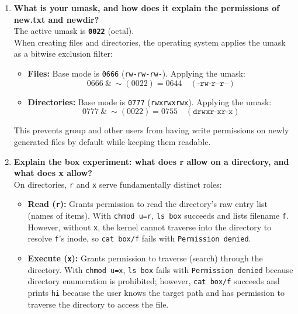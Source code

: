 \documentclass{labreport}
\begin{document}
\begin{enumerate}[leftmargin=*]
    \item \textbf{What is your umask, and how does it explain the permissions of new.txt and newdir?}\\[0.2em]
    The active umask is \textbf{\texttt{0022}} (octal).\\
    When creating files and directories, the operating system applies the umask as a bitwise exclusion filter:
    \begin{itemize}[noitemsep, topsep=2pt]
        \item \textbf{Files:} Base mode is \texttt{0666} (\texttt{rw-rw-rw-}). Applying the umask:
        \[
        0666 \ \& \ \sim(0022) = 0644 \quad (\texttt{-rw-r--r--})
        \]
        \item \textbf{Directories:} Base mode is \texttt{0777} (\texttt{rwxrwxrwx}). Applying the umask:
        \[
        0777 \ \& \ \sim(0022) = 0755 \quad (\texttt{drwxr-xr-x})
        \]
    \end{itemize}
    This prevents group and other users from having write permissions on newly generated files by default while keeping them readable.

    \item \textbf{Explain the box experiment: what does r allow on a directory, and what does x allow?}\\[0.2em]
    On directories, \texttt{r} and \texttt{x} serve fundamentally distinct roles:
    \begin{itemize}[noitemsep, topsep=2pt]
        \item \textbf{Read (\texttt{r}):} Grants permission to read the directory's raw entry list (names of items). With \texttt{chmod u=r}, \texttt{ls box} succeeds and lists filename \texttt{f}. However, without \texttt{x}, the kernel cannot traverse into the directory to resolve \texttt{f}'s inode, so \texttt{cat box/f} fails with \texttt{Permission denied}.
        \item \textbf{Execute (\texttt{x}):} Grants permission to traverse (search) through the directory. With \texttt{chmod u=x}, \texttt{ls box} fails with \texttt{Permission denied} because directory enumeration is prohibited; however, \texttt{cat box/f} succeeds and prints \texttt{hi} because the user knows the target path and has permission to traverse the directory to access the file.
    \end{itemize}


\end{enumerate}
\end{document}
